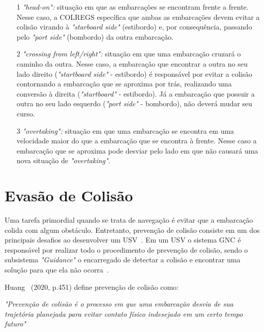         \begin{enumerate}
            \item [1] \textit{"head-on":} situação em que as embarcações se encontram frente a frente. Nesse caso, a COLREGS específica que ambas as embarcações devem evitar a colisão virando à \textit{"starboard side"} (estibordo) e, por consequência, passando pelo \textit{"port side"} (bombordo) da outra embarcação.
            
            \item [2] \textit{"crossing from left/right":} situação em que uma embarcação cruzará o caminho da outra. Nesse caso, a embarcação que encontrar a outra no seu lado direito (\textit{"startboard side"} - estibordo) é responsável por evitar a colisão contornando a embarcação que se aproxima por trás, realizando uma conversão à direita (\textit{"startboard"} - estibordo). Já a embarcação que possuir a outra no seu lado esquerdo (\textit{"port side"} - bombordo), não deverá mudar seu curso.
            
            \item [3] \textit{"overtaking":} situação em que uma embarcação se encontra em uma velocidade maior do que a embarcação que se encontra à frente. Nesse caso a embarcação que se aproxima pode desviar pelo lado em que não causará uma nova situação de \textit{"overtaking"}.
        \end{enumerate}
    
    \section{Evasão de Colisão}\label{subchap2:prev_col}
        Uma tarefa primordial quando se trata de navegação é evitar que a embarcação colida com algum obstáculo. Entretanto, prevenção de colisão consiste em um dos principais desafios ao desenvolver um USV~\cite{JURAK2020}. Em um USV o sistema GNC é responsável por realizar todo o procedimento de prevenção de colisão, sendo o subsistema \textit{"Guidance"} o encarregado de detectar a colisão e encontrar uma solução para que ela não ocorra~\cite{HUANG2020451}.
        
        Huang \etal~(2020, p.451) define prevenção de colisão como:
        \begin{directcite}
            \textit{"Prevenção de colisão é o processo em que uma embarcação desvia de sua trajetória planejada para evitar contato físico indesejado em um certo tempo futuro"}
        \end{directcite}
        
